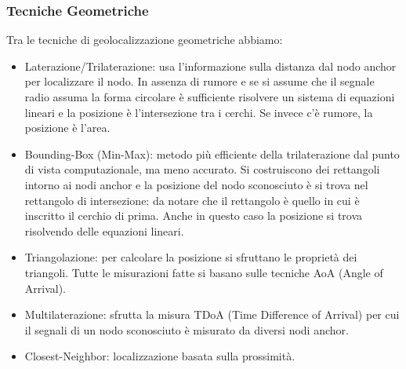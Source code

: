         \subsubsection{Tecniche Geometriche}\label{subsubsec3.5.1}
        Tra le tecniche di geolocalizzazione geometriche abbiamo:
        \begin{itemize}
                \item Laterazione/Trilaterazione: usa l'informazione sulla
distanza dal nodo anchor per localizzare il nodo. In assenza di rumore e se si
assume che il segnale radio assuma la forma circolare è sufficiente risolvere un
sistema di equazioni lineari e la posizione è l'intersezione tra i cerchi. Se
invece c'è rumore, la posizione è l'area.
                \item Bounding-Box (Min-Max): metodo più efficiente della
trilaterazione dal punto di vista computazionale, ma meno accurato. Si
costruiscono dei rettangoli intorno ai nodi anchor e la posizione del nodo
sconosciuto è si trova nel rettangolo di intersezione: da notare che il
rettangolo è quello in cui è inscritto il cerchio di prima. Anche in questo caso
la posizione si trova risolvendo delle equazioni lineari.
                \item Triangolazione: per calcolare la posizione si sfruttano le
proprietà dei triangoli. Tutte le misurazioni fatte si basano sulle tecniche AoA
(Angle of Arrival).
                \item Multilaterazione: sfrutta la misura TDoA (Time Difference
of Arrival) per cui il segnali di un nodo sconosciuto è misurato da diversi nodi
anchor.
                \item Closest-Neighbor: localizzazione basata sulla prossimità.
        \end{itemize}
% 
